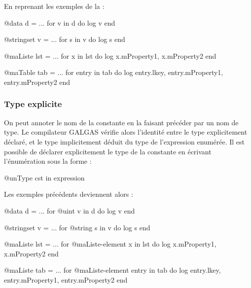 En reprenant les exemples de la  :

\begin{galgas}
@data d = ...
for v in d do
  log v
end
\end{galgas}



\begin{galgas}
@stringset v = ...
for s in v do
  log s
end
\end{galgas}


\begin{galgas}
@maListe lst = ...
for x in lst do
  log x.mProperty1, x.mProperty2
end
\end{galgas}


\begin{galgas}
@maTable tab = ...
for entry in tab do
  log entry.lkey, entry.mProperty1, entry.mProperty2
end
\end{galgas}

\subsubsection{Type explicite}

On peut annoter le nom de la constante en la faisant précéder par un nom de type. Le compilateur GALGAS vérifie alors l'identité entre le type explicitement déclaré, et le type implicitement déduit du type de l'expression enumérée. Il est possible de déclarer explicitement le type de la constante en écrivant l'énumération sous la forme :

\begin{galgas}
@unType cst in expression
\end{galgas}

Les exemples précédents deviennent alors :

\begin{galgas}
@data d = ...
for @uint v in d do
  log v
end
\end{galgas}



\begin{galgas}
@stringset v = ...
for @string s in v do
  log s
end
\end{galgas}


\begin{galgas}
@maListe lst = ...
for @maListe-element x in lst do
  log x.mProperty1, x.mProperty2
end
\end{galgas}


\begin{galgas}
@maListe tab = ...
for @maListe-element entry in tab do
  log entry.lkey, entry.mProperty1, entry.mProperty2
end
\end{galgas}



